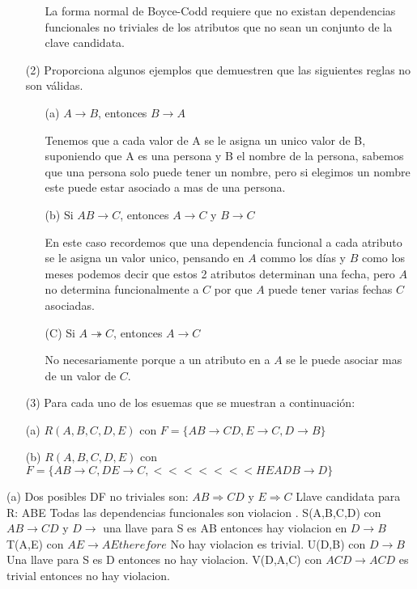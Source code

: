 \documentclass{article}
\begin{document}
\begin{enumerate}
\begin{enumerate}
      La forma normal de Boyce-Codd requiere que no existan dependencias
      funcionales no triviales de los atributos que no sean un conjunto de la
      clave candidata.
    \end{enumerate}
  \item[(2)] Proporciona algunos ejemplos que demuestren que las siguientes reglas
  no son válidas.
    \begin{enumerate}
      \item[(a)] $A \rightarrow B$, entonces $B \rightarrow A$

      Tenemos que a cada valor de A se le asigna un unico valor de B,
      suponiendo que A es una persona y B el nombre de la persona, sabemos que una
      persona solo puede tener un nombre, pero si elegimos un nombre este puede
      estar asociado a mas de una persona.
      \item[(b)] Si $AB \rightarrow C$, entonces $A \rightarrow C$ y $B \rightarrow C$

      En este caso recordemos que una dependencia funcional a cada atributo se le
      asigna un valor unico, pensando en $A$ commo los días y $B$ como los meses
      podemos decir que estos 2 atributos determinan una fecha, pero $A$ no
      determina funcionalmente a $C$ por que $A$ puede tener varias fechas $C$
      asociadas.

      \item[(C)] Si $A \twoheadrightarrow C$, entonces $A \rightarrow C$

      No necesariamente porque a un atributo en a $A$ se le puede asociar mas de
      un valor de $C$.

    \end{enumerate}
    \item[(3)] Para cada uno de los esuemas que se muestran a continuación:
      
        \item[(a)] $R(A,B,C,D,E)$ con $F=\{ AB \rightarrow CD, E \rightarrow C
        ,D \rightarrow B \}$
        \item[(b)] $R(A,B,C,D,E)$ con $F= \{ AB \rightarrow C, DE \rightarrow C,
<<<<<<< HEAD
        B \rightarrow D \}$
      \end{enumerate}

        \item[(a)] Dos posibles DF no triviales son: $AB \Rightarrow CD$ y
        $E \Rightarrow C$
        Llave candidata para R: ABE
        Todas las dependencias funcionales son violacion .
        S(A,B,C,D) con $AB \rightarrow CD$ y $D \rightarrow$ una llave para S es
        AB entonces hay violacion en $D \rightarrow B$
        T(A,E) con $AE \rightarrow AE$$therefore$ No hay violacion es trivial.
         U(D,B) con $D \rightarrow B$ Una llave para S es D entonces no hay
         violacion.
         V(D,A,C) con $ACD \rightarrow ACD$ es trivial entonces no hay violacion.
\end{document}
